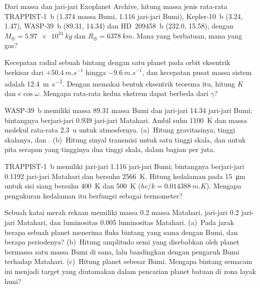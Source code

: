 \begin{exercise}[$\star\star$]\label{exo:b3:exoplanets:6}
Dari massa dan jari-jari Exoplanet Archive, hitung massa jenis rata-rata
TRAPPIST-1~b (1.374 massa Bumi, 1.116 jari-jari Bumi),
Kepler-10~b (3.24, 1.47), WASP-39~b (89.31, 14.34) dan HD~209458~b (232.0,
15.58), dengan $M_\oplus = \qty{5.97e24}{kg}$ dan $R_\oplus =
\qty{6378}{km}$. Mana yang berbatuan, mana yang gas?
\end{exercise}

\begin{exercise}[$\star\star$]\label{exo:b3:exoplanets:7}
Kecepatan radial sebuah bintang dengan satu planet pada orbit eksentrik
berkisar dari $+\qty{50.4}{m.s^{-1}}$ hingga $-\qty{9.6}{m.s^{-1}}$, dan kecepatan
pusat massa sistem adalah \qty{12.4}{m.s^{-1}}. Dengan memakai bentuk eksentrik
teorema itu, hitung $K$ dan $e\cos\omega$. Mengapa rata-rata kedua ekstrem
dapat berbeda dari $\gamma$?
\end{exercise}

\begin{exercise}[$\star\star$]\label{exo:b3:exoplanets:8}
WASP-39~b memiliki massa 89.31 massa Bumi dan jari-jari 14.34 jari-jari Bumi;
bintangnya berjari-jari 0.939 jari-jari Matahari. Ambil suhu \qty{1100}{K} dan
massa molekul rata-rata \qty{2.3}{u} untuk atmosfernya. (a)~Hitung gravitasinya,
tinggi skalanya, dan . (b)~Hitung sinyal transmisi untuk
satu tinggi skala, dan untuk pita serapan yang tingginya dua tinggi skala,
dalam bagian per juta.
\end{exercise}

\begin{exercise}[$\star\star$]\label{exo:b3:exoplanets:9}
TRAPPIST-1~b memiliki jari-jari 1.116 jari-jari Bumi; bintangnya berjari-jari 0.1192
jari-jari Matahari dan bersuhu \qty{2566}{K}. Hitung kedalaman  pada
\qty{15}{\micro m} untuk sisi siang bersuhu \qty{400}{K} dan \qty{500}{K}
($hc/k = \qty{0.014388}{m.K}$). Mengapa pengukuran kedalaman itu berfungsi
sebagai termometer?
\end{exercise}

\begin{exercise}[$\star\star\star$]\label{exo:b3:exoplanets:10}
Sebuah katai merah rekaan memiliki massa 0.2 massa Matahari, jari-jari 0.2 jari-jari Matahari,
dan luminositas \num{0.005} luminositas Matahari. (a)~Pada jarak berapa sebuah planet
menerima fluks bintang yang sama dengan Bumi, dan berapa periodenya?
(b)~Hitung amplitudo semi yang disebabkan oleh planet bermassa satu massa Bumi di sana,
lalu bandingkan dengan pengaruh Bumi terhadap Matahari. (c)~Hitung 
planet sebesar Bumi. Mengapa bintang semacam ini menjadi target yang diutamakan
dalam pencarian planet batuan di zona layak huni?
\end{exercise}

